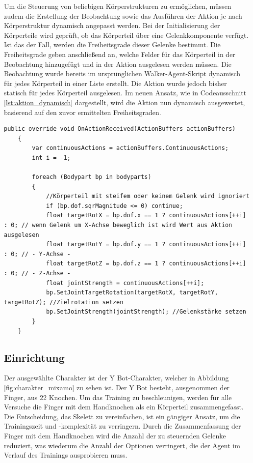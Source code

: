 Um die Steuerung von beliebigen Körperstrukturen zu ermöglichen, müssen zudem die Erstellung der Beobachtung sowie das Ausführen der Aktion je nach Körperstruktur dynamisch angepasst werden. Bei der Initialisierung der Körperteile wird geprüft, ob das Körperteil über eine Gelenkkomponente verfügt. Ist das der Fall, werden die Freiheitsgrade dieser Gelenke bestimmt. Die Freiheitsgrade geben anschließend an, welche Felder für das Körperteil in der Beobachtung hinzugefügt und in der Aktion ausgelesen werden müssen. Die Beobachtung wurde bereits im ursprünglichen Walker-Agent-Skript dynamisch für jedes Körperteil in einer Liste erstellt. Die Aktion wurde jedoch bisher statisch für jedes Körperteil ausgelesen. Im neuen Ansatz, wie in Codeausschnitt \ref{lst:aktion_dynamisch} dargestellt, wird die Aktion nun dynamisch ausgewertet, basierend auf den zuvor ermittelten Freiheitsgraden.

\begin{lstlisting}[caption={Agent Aktion in Bewegung umwandeln},captionpos=b,label={lst:aktion_dynamisch}]
public override void OnActionReceived(ActionBuffers actionBuffers)
    {
        var continuousActions = actionBuffers.ContinuousActions;
        int i = -1;

        foreach (Bodypart bp in bodyparts)
        {
            //Körperteil mit steifem oder keinem Gelenk wird ignoriert
            if (bp.dof.sqrMagnitude <= 0) continue;
            float targetRotX = bp.dof.x == 1 ? continuousActions[++i] : 0; // wenn Gelenk um X-Achse beweglich ist wird Wert aus Aktion ausgelesen
            float targetRotY = bp.dof.y == 1 ? continuousActions[++i] : 0; // - Y-Achse - 
            float targetRotZ = bp.dof.z == 1 ? continuousActions[++i] : 0; // - Z-Achse - 
            float jointStrength = continuousActions[++i];
            bp.SetJointTargetRotation(targetRotX, targetRotY, targetRotZ); //Zielrotation setzen
            bp.SetJointStrength(jointStrength); //Gelenkstärke setzen
        }
    }
\end{lstlisting}

\subsection{Einrichtung}
Der ausgewählte Charakter ist der Y Bot-Charakter, welcher in Abbildung \ref{fig:charakter_mixamo} zu sehen ist. Der Y Bot besteht, ausgenommen der Finger, aus 22 Knochen. Um das Training zu beschleunigen, werden für alle Versuche die Finger mit dem Handknochen als ein Körperteil zusammengefasst. Die Entscheidung, das Skelett zu vereinfachen, ist ein gängiger Ansatz, um die Trainingszeit und -komplexität zu verringern. Durch die Zusammenfassung der Finger mit dem Handknochen wird die Anzahl der zu steuernden Gelenke reduziert, was wiederum die Anzahl der Optionen verringert, die der Agent im Verlauf des Trainings ausprobieren muss.

